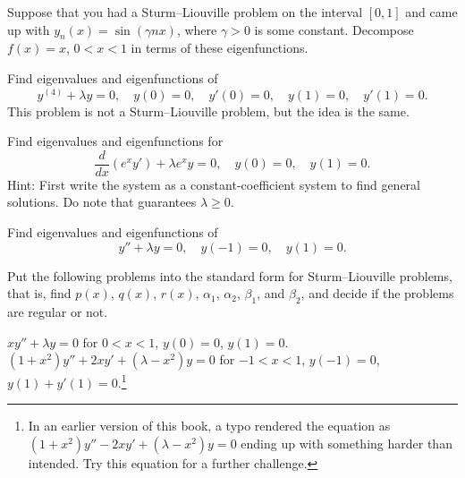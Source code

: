 \begin{exercise}
Suppose that you had a Sturm--Liouville problem on the interval
$[0,1]$ and came up with
$y_n(x) = \sin (\gamma n x)$, where $\gamma > 0$ is some constant.
Decompose $f(x) = x$, $0 < x < 1$ in terms of these eigenfunctions.
\end{exercise}

\begin{exercise}
Find eigenvalues and eigenfunctions of
\begin{equation*}
y^{(4)}+\lambda y = 0, \quad y(0) = 0, \quad y'(0) = 0, \quad y(1) = 0, \quad
y'(1) = 0 .
\end{equation*}
This problem is not a Sturm--Liouville problem, but the idea is the same.
\end{exercise}

\begin{exercise}
Find eigenvalues and eigenfunctions for
\begin{equation*}
\frac{d}{dx} (e^x y') + \lambda e^x y = 0, \quad y(0) = 0, \quad y(1) = 0 .
\end{equation*}
Hint: First write the system as a constant-coefficient system to find
general solutions.  Do note that  guarantees $\lambda \geq 0$.
\end{exercise}

\setcounter{exercise}{100}

\begin{exercise}
Find eigenvalues and eigenfunctions of
\begin{equation*}
y'' + \lambda y = 0, \quad y(-1) = 0, \quad y(1) = 0 .
\end{equation*}
\end{exercise}

\begin{exercise}
Put the following problems into the standard form for Sturm--Liouville
problems, that is, find $p(x)$, $q(x)$, $r(x)$,
$\alpha_1$,
$\alpha_2$,
$\beta_1$, and
$\beta_2$,
and decide if the problems are regular or not.
\begin{tasks}
\task $x y'' + \lambda y = 0$
\enspace for $0 < x < 1$,
\enspace $y(0) = 0$,
\enspace $y(1) = 0$.
\task
$(1+x^2) y'' + 2xy' + (\lambda-x^2) y = 0$
\enspace for $-1 < x < 1$,
\enspace $y(-1) = 0$,
\enspace $y(1)+y'(1) = 0$.\footnote{%
In an earlier version of this book, a typo rendered the equation
as $(1+x^2) y'' - 2xy' + (\lambda-x^2) y = 0$ ending up with something
harder than intended.  Try this equation for a further challenge.}
\end{tasks}
\end{exercise}

